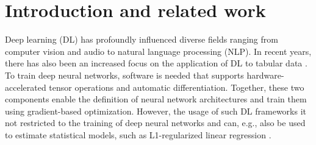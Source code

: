 \documentclass[article]{jss}
\theoremstyle{definition}
\begin{document}
\begin{comment}
Non-text TODOs:

\begin{itemize}
    \item [ ] I should provide all the documentation as part of the mlr3 book before submission
    \item [ ] ensure that caching is enabled in code because otherwise temp directory might be deleted for the melanoma dataset on linux
    \item [ ] Check that networks / learners that are not trained here still can be trained and are correctly constructed
    \item [ ] check that everything is working (like created callback) when it is not explicitly run in the code
    \item [ ] Should include JIT-improvements in torch and make a release, otherwise benchmark result is a little misleading
\end{itemize}

Text TODOs:

\begin{itemize}
    \item Appendix: What should be there? And if we add it there, reference it in the main text.
    \item Upkeep with mlr3torch: different output dim
\end{itemize}

\end{comment}

%
%
%
%
%

\section{Introduction and related work}

Deep learning (DL) has profoundly influenced diverse fields ranging from computer vision and audio to natural language processing (NLP).
In recent years, there has also been an increased focus on the application of DL to tabular data \citep{ref-borisov2022deep}.
To train deep neural networks, software is needed that supports hardware-accelerated tensor operations and automatic differentiation.
Together, these two components enable the definition of neural network architectures and train them using gradient-based optimization.
However, the usage of such DL frameworks it not restricted to the training of deep neural networks and can, e.g., also be used to estimate statistical models, such as L1-regularized linear regression \citep{rugamer2024semi}.
\end{document}
